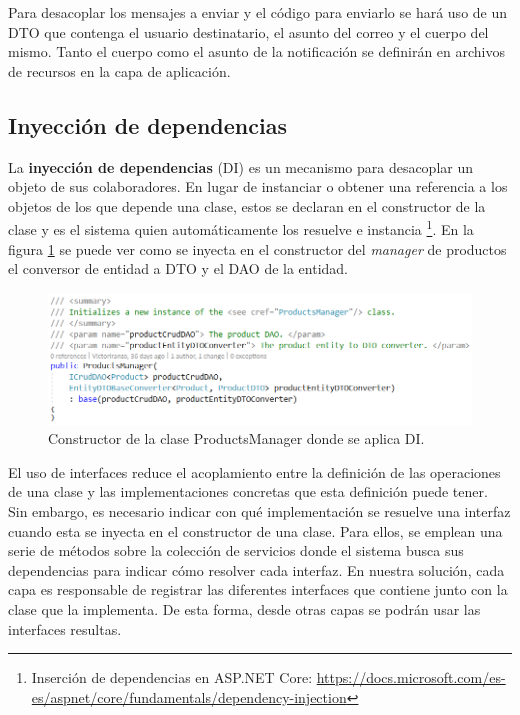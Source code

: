 \documentclass[11pt,spanish,listoffigures]{tfgetsinf}
\begin{document}
Para desacoplar los mensajes a enviar y el código para enviarlo se hará uso de un DTO que contenga el usuario destinatario, el asunto del correo y el cuerpo del mismo. Tanto el cuerpo como el asunto de la notificación se definirán en archivos de recursos en la capa de aplicación.

\subsection{Inyección de dependencias}

La \textbf{inyección de dependencias} (DI) es un mecanismo para desacoplar un objeto de sus colaboradores. En lugar de instanciar o obtener una referencia a los objetos de los que depende una clase, estos se declaran en el constructor de la clase y es el sistema quien automáticamente los resuelve e instancia \footnote{ Inserción de dependencias en ASP.NET Core: \url{https://docs.microsoft.com/es-es/aspnet/core/fundamentals/dependency-injection}}. En la figura \ref{fig:ProductsManager} se puede ver como se inyecta en el constructor del \textit{manager} de productos el conversor de entidad a DTO y el DAO de la entidad.

\begin{figure}[h]
\centering
\includegraphics[scale=0.8]{ProductsManager}
\caption{Constructor de la clase ProductsManager donde se aplica DI.}
\label{fig:ProductsManager}
\end{figure}

El uso de interfaces reduce el acoplamiento entre la definición de las operaciones de una clase y las implementaciones concretas que esta definición puede tener. Sin embargo, es necesario indicar con qué implementación se resuelve una interfaz cuando esta se inyecta en el constructor de una clase. Para ellos, se emplean una serie de métodos sobre la colección de servicios donde el sistema busca sus dependencias para indicar cómo resolver cada interfaz. En nuestra solución, cada capa es responsable de registrar las diferentes interfaces que contiene junto con la clase que la implementa. De esta forma, desde otras capas se podrán usar las interfaces resultas.
\end{document}
